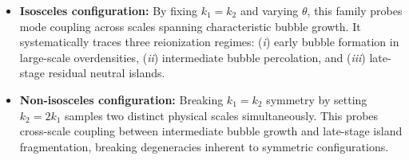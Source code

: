 \documentclass[apj,twocolumn, appendixfloats, twocolappendix, numberedappendix, tighten]{openjournal}
\begin{document}
\begin{itemize}


    \item \textbf{Isosceles configuration:} By fixing $k_1 = k_2$ and varying $\theta$, this family probes mode coupling across scales spanning characteristic bubble growth. It systematically traces three reionization regimes: (\textit{i}) early bubble formation in large-scale overdensities, (\textit{ii}) intermediate bubble percolation, and (\textit{iii}) late-stage residual neutral islands. %

    \item \textbf{Non-isosceles configuration:} Breaking $k_1 = k_2$ symmetry by setting $k_2 = 2k_1$ samples two distinct physical scales simultaneously. This probes cross-scale coupling between intermediate bubble growth and late-stage island fragmentation, breaking degeneracies inherent to symmetric configurations. %
\end{itemize}
\end{document}

